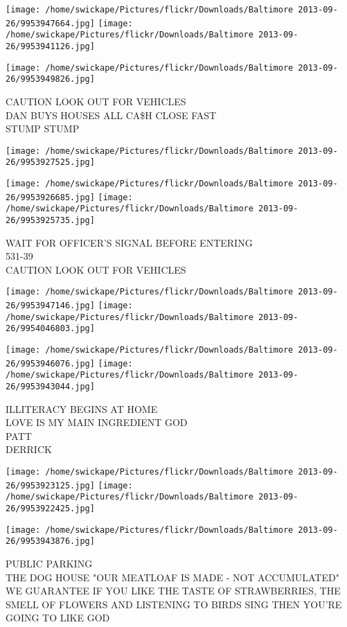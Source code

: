 \documentclass[10pt,letterpaper]{article}
\begin{document}
\texttt{[image: /home/swickape/Pictures/flickr/Downloads/Baltimore 2013-09-26/9953947664.jpg]}
\texttt{[image: /home/swickape/Pictures/flickr/Downloads/Baltimore 2013-09-26/9953941126.jpg]}

\texttt{[image: /home/swickape/Pictures/flickr/Downloads/Baltimore 2013-09-26/9953949826.jpg]}

CAUTION LOOK OUT FOR VEHICLES\\
DAN BUYS HOUSES ALL CA\$H CLOSE FAST\\
STUMP STUMP
\pagebreak

\texttt{[image: /home/swickape/Pictures/flickr/Downloads/Baltimore 2013-09-26/9953927525.jpg]}

\vspace{0.25in}
\texttt{[image: /home/swickape/Pictures/flickr/Downloads/Baltimore 2013-09-26/9953926685.jpg]}
\texttt{[image: /home/swickape/Pictures/flickr/Downloads/Baltimore 2013-09-26/9953925735.jpg]}

WAIT FOR OFFICER'S SIGNAL BEFORE ENTERING\\
531{-}39\\
CAUTION LOOK OUT FOR VEHICLES
\pagebreak

\texttt{[image: /home/swickape/Pictures/flickr/Downloads/Baltimore 2013-09-26/9953947146.jpg]}
\texttt{[image: /home/swickape/Pictures/flickr/Downloads/Baltimore 2013-09-26/9954046803.jpg]}

\texttt{[image: /home/swickape/Pictures/flickr/Downloads/Baltimore 2013-09-26/9953946076.jpg]}
\texttt{[image: /home/swickape/Pictures/flickr/Downloads/Baltimore 2013-09-26/9953943044.jpg]}

ILLITERACY BEGINS AT HOME\\
LOVE IS MY MAIN INGREDIENT GOD\\
PATT\\
DERRICK
\pagebreak

\texttt{[image: /home/swickape/Pictures/flickr/Downloads/Baltimore 2013-09-26/9953923125.jpg]}
\texttt{[image: /home/swickape/Pictures/flickr/Downloads/Baltimore 2013-09-26/9953922425.jpg]}

\texttt{[image: /home/swickape/Pictures/flickr/Downloads/Baltimore 2013-09-26/9953943876.jpg]}

PUBLIC PARKING\\
THE DOG HOUSE "OUR MEATLOAF IS MADE {-} NOT ACCUMULATED"\\
WE GUARANTEE IF YOU LIKE THE TASTE OF STRAWBERRIES, THE SMELL OF FLOWERS AND LISTENING TO BIRDS SING THEN YOU'RE GOING TO LIKE GOD
\pagebreak
\end{document}
